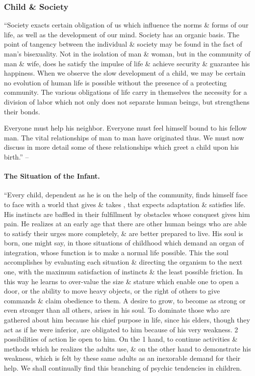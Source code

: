 \documentclass{article}
\begin{document}
\subsubsection{Child \& Society}
``Society exacts certain obligation of us which influence the norms \& forms of our life, as well as the development of our mind. Society has an organic basis. The point of tangency between the individual \& society may be found in the fact of man's bisexuality. Not in the isolation of man \& woman, but in the community of man \& wife, does he satisfy the impulse of life \& achieve security \& guarantee his happiness. When we observe the slow development of a child, we may be certain no evolution of human life is possible without the presence of a protecting community. The various obligations of life carry in themselves the necessity for a division of labor which not only does not separate human beings, but strengthens their bonds.

Everyone must help his neighbor. Everyone must feel himself bound to his fellow man. The vital relationships of man to man have originated thus. We must now discuss in more detail some of these relationships which greet a child upon his birth.'' -- \cite[p. 33]{Adler_human_nature}

\paragraph{The Situation of the Infant.} ``Every child, dependent as he is on the help of the community, finds himself face to face with a world that gives \& takes \cite{Grant_give_take,Grant_give_take_VN}, that expects adaptation \& satisfies life. His instincts are baffled in their fulfillment by obstacles whose conquest gives him pain. He realizes at an early age that there are other human beings who are able to satisfy their urges more completely, \& are better prepared to live. His soul is born, one might say, in those situations of childhood which demand an organ of integration, whose function is to make a normal life possible. This the soul accomplishes by evaluating each situation \& directing the organism to the next one, with the maximum satisfaction of instincts \& the least possible friction. In this way he learns to over-value the size \& stature which enable one to open a door, or the ability to move heavy objects, or the right of others to give commands \& claim obedience to them. A desire to grow, to become as strong or even stronger than all others, arises in his soul. To dominate those who are gathered about him because his chief purpose in life, since his elders, though they act as if he were inferior, are obligated to him because of his very weakness. 2 possibilities of action lie open to him. On the 1 hand, to continue activities \& methods which he realizes the adults use, \& on the other hand to demonstrate his weakness, which is felt by these same adults as an inexorable demand for their help. We shall continually find this branching of psychic tendencies in children.
\end{document}
